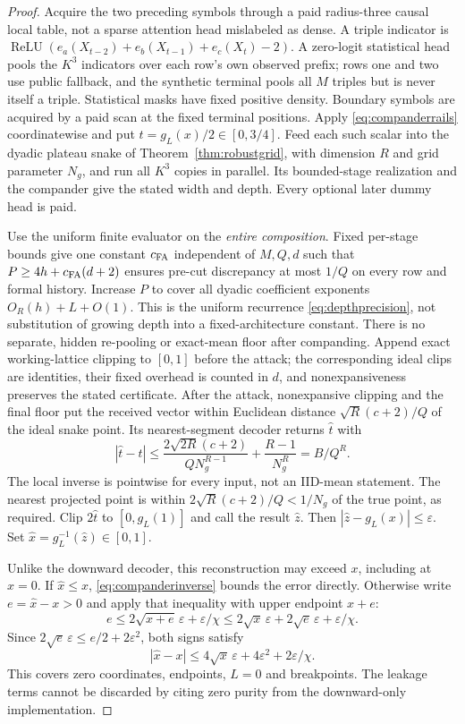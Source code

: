 \documentclass[11pt,letterpaper]{article}
\theoremstyle{definition}\newtheorem{definition}[theorem]{Definition}
\theoremstyle{remark}\newtheorem{remark}[theorem]{Remark}
\begin{document}
\begin{proof}
Acquire the two preceding symbols through a paid radius-three causal local table, not a sparse attention head mislabeled as dense. A triple indicator is
$\operatorname{ReLU}(e_a(X_{t-2})+e_b(X_{t-1})+e_c(X_t)-2)$.
A zero-logit statistical head pools the $K^3$ indicators over each row's own observed prefix; rows one and two use public fallback, and the synthetic terminal pools all $M$ triples but is never itself a triple. Statistical masks have fixed positive density. Boundary symbols are acquired by a paid scan at the fixed terminal positions. Apply \eqref{eq:companderrails} coordinatewise and put $t=g_L(x)/2\in[0,3/4]$. Feed each such scalar into the dyadic plateau snake of Theorem~\ref{thm:robustgrid}, with dimension $R$ and grid parameter $N_g$, and run all $K^3$ copies in parallel. Its bounded-stage realization and the compander give the stated width and depth. Every optional later dummy head is paid.

Use the uniform finite evaluator on the \emph{entire composition}. Fixed per-stage bounds give one constant $c_{\rm FA}$ independent of $M,Q,d$ such that
$P\ge4h+c_{\rm FA}(d+2)$ ensures pre-cut discrepancy at most $1/Q$ on every row and formal history. Increase $P$ to cover all dyadic coefficient exponents $O_R(h)+L+O(1)$. This is the uniform recurrence \eqref{eq:depthprecision}, not substitution of growing depth into a fixed-architecture constant. There is no separate, hidden re-pooling or exact-mean floor after companding. Append exact working-lattice clipping to $[0,1]$ before the attack; the corresponding ideal clips are identities, their fixed overhead is counted in $d$, and nonexpansiveness preserves the stated certificate.
After the attack, nonexpansive clipping and the final floor put the received vector within Euclidean distance $\sqrt R(c+2)/Q$ of the ideal snake point. Its nearest-segment decoder returns $\widehat t$ with
\[
 |\widehat t-t|\le
 \frac{2\sqrt{2R}(c+2)}{QN_g^{R-1}}+\frac{R-1}{N_g^R}
 =B/Q^R.
\]
The local inverse is pointwise for every input, not an IID-mean statement. The nearest projected point is within $2\sqrt R(c+2)/Q<1/N_g$ of the true point, as required. Clip $2\widehat t$ to $[0,g_L(1)]$ and call the result $\widehat z$. Then
$|\widehat z-g_L(x)|\le\varepsilon$. Set $\widehat x=g_L^{-1}(\widehat z)\in[0,1]$.

Unlike the downward decoder, this reconstruction may exceed $x$, including at $x=0$. If $\widehat x\le x$, \eqref{eq:companderinverse} bounds the error directly. Otherwise write $e=\widehat x-x>0$ and apply that inequality with upper endpoint $x+e$:
\[
 e\le2\sqrt{x+e}\,\varepsilon+\varepsilon/\chi
 \le2\sqrt x\,\varepsilon+2\sqrt e\,\varepsilon+\varepsilon/\chi.
\]
Since $2\sqrt e\,\varepsilon\le e/2+2\varepsilon^2$, both signs satisfy
\begin{equation}\label{eq:symmetricinverse}
 |\widehat x-x|\le4\sqrt x\,\varepsilon+4\varepsilon^2+2\varepsilon/\chi.
\end{equation}
This covers zero coordinates, endpoints, $L=0$ and breakpoints. The leakage terms cannot be discarded by citing zero purity from the downward-only implementation.


\end{proof}
\end{document}
